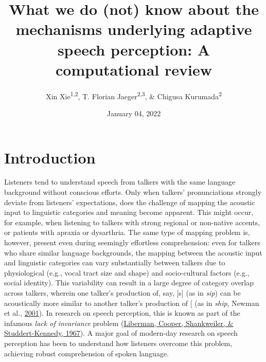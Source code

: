 \documentclass[
  11pt,
  english,
  man,floatsintext]{apa6}
\title{What we do (not) know about the mechanisms underlying adaptive speech perception: A computational review}
\author{Xin Xie\textsuperscript{1,2}, T. Florian Jaeger\textsuperscript{2,3}, \& Chigusa Kurumada\textsuperscript{2}}
\date{January 04, 2022}
\affiliation{\vspace{0.5cm}\textsuperscript{1} Language Science, University of California, Irvine\\\textsuperscript{2} Brain and Cognitive Sciences, University of Rochester\\\textsuperscript{3} Computer Science, University of Rochester}
\begin{document}
\maketitle

\hypertarget{introduction}{%
\section{Introduction}\label{introduction}}

Listeners tend to understand speech from talkers with the same language background without conscious efforts. Only when talkers' pronunciations strongly deviate from listeners' expectations, does the challenge of mapping the acoustic input to linguistic categories and meaning become apparent. This might occur, for example, when listening to talkers with strong regional or non-native accents, or patients with apraxia or dysarthria. The same type of mapping problem is, however, present even during seemingly effortless comprehension: even for talkers who share similar language backgrounds, the mapping between the acoustic input and linguistic categories can vary substantially between talkers due to physiological (e.g., vocal tract size and shape) and socio-cultural factors (e.g., social identity). This variability can result in a large degree of category overlap across talkers, wherein one talker's production of, say, {[}s{]} (as in \emph{sip}) can be acoustically more similar to another talker's production of {[}\ipatext{ʃ}{]} (as in \emph{ship}, Newman et al., \protect\hyperlink{ref-newman2001}{2001}). In research on speech perception, this is known as part of the infamous \emph{lack of invariance} problem (\protect\hyperlink{ref-liberman1967}{Liberman, Cooper, Shankweiler, \& Studdert-Kennedy, 1967}). A major goal of modern-day research on speech perception has been to understand how listeners overcome this problem, achieving robust comprehension of spoken language.
\end{document}
